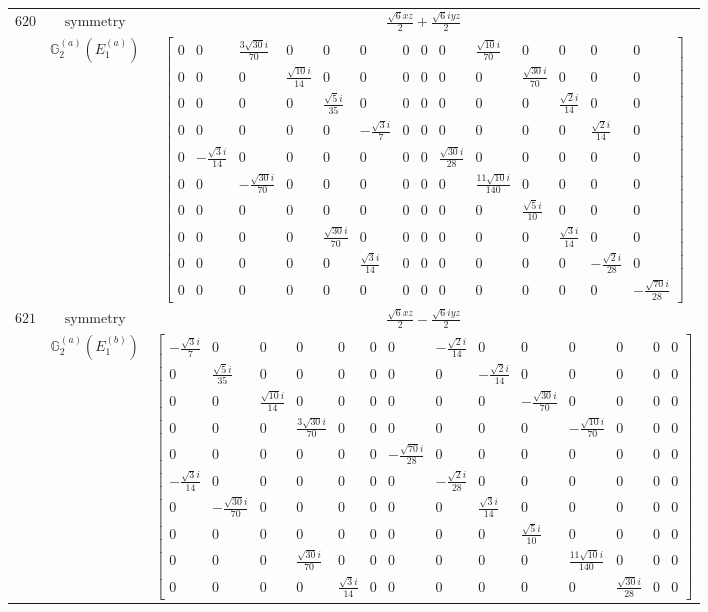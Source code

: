 \documentclass[fleqn,8pt,landscape]{jsarticle}
\begin{document}
\begin{longtable}{ccc}
$ 620 $ & $ \text{symmetry} $ & $ \frac{\sqrt{6} x z}{2} + \frac{\sqrt{6} i y z}{2} $ \\
$  $ & $ \mathbb{G}_{2}^{(a)}(E_{1}^{(a)}) $ & $ \begin{bmatrix} 0 & 0 & \frac{3 \sqrt{30} i}{70} & 0 & 0 & 0 & 0 & 0 & 0 & \frac{\sqrt{10} i}{70} & 0 & 0 & 0 & 0 \\ 0 & 0 & 0 & \frac{\sqrt{10} i}{14} & 0 & 0 & 0 & 0 & 0 & 0 & \frac{\sqrt{30} i}{70} & 0 & 0 & 0 \\ 0 & 0 & 0 & 0 & \frac{\sqrt{5} i}{35} & 0 & 0 & 0 & 0 & 0 & 0 & \frac{\sqrt{2} i}{14} & 0 & 0 \\ 0 & 0 & 0 & 0 & 0 & - \frac{\sqrt{3} i}{7} & 0 & 0 & 0 & 0 & 0 & 0 & \frac{\sqrt{2} i}{14} & 0 \\ 0 & - \frac{\sqrt{3} i}{14} & 0 & 0 & 0 & 0 & 0 & 0 & \frac{\sqrt{30} i}{28} & 0 & 0 & 0 & 0 & 0 \\ 0 & 0 & - \frac{\sqrt{30} i}{70} & 0 & 0 & 0 & 0 & 0 & 0 & \frac{11 \sqrt{10} i}{140} & 0 & 0 & 0 & 0 \\ 0 & 0 & 0 & 0 & 0 & 0 & 0 & 0 & 0 & 0 & \frac{\sqrt{5} i}{10} & 0 & 0 & 0 \\ 0 & 0 & 0 & 0 & \frac{\sqrt{30} i}{70} & 0 & 0 & 0 & 0 & 0 & 0 & \frac{\sqrt{3} i}{14} & 0 & 0 \\ 0 & 0 & 0 & 0 & 0 & \frac{\sqrt{3} i}{14} & 0 & 0 & 0 & 0 & 0 & 0 & - \frac{\sqrt{2} i}{28} & 0 \\ 0 & 0 & 0 & 0 & 0 & 0 & 0 & 0 & 0 & 0 & 0 & 0 & 0 & - \frac{\sqrt{70} i}{28} \end{bmatrix} $ \\ \hline
$ 621 $ & $ \text{symmetry} $ & $ \frac{\sqrt{6} x z}{2} - \frac{\sqrt{6} i y z}{2} $ \\
$  $ & $ \mathbb{G}_{2}^{(a)}(E_{1}^{(b)}) $ & $ \begin{bmatrix} - \frac{\sqrt{3} i}{7} & 0 & 0 & 0 & 0 & 0 & 0 & - \frac{\sqrt{2} i}{14} & 0 & 0 & 0 & 0 & 0 & 0 \\ 0 & \frac{\sqrt{5} i}{35} & 0 & 0 & 0 & 0 & 0 & 0 & - \frac{\sqrt{2} i}{14} & 0 & 0 & 0 & 0 & 0 \\ 0 & 0 & \frac{\sqrt{10} i}{14} & 0 & 0 & 0 & 0 & 0 & 0 & - \frac{\sqrt{30} i}{70} & 0 & 0 & 0 & 0 \\ 0 & 0 & 0 & \frac{3 \sqrt{30} i}{70} & 0 & 0 & 0 & 0 & 0 & 0 & - \frac{\sqrt{10} i}{70} & 0 & 0 & 0 \\ 0 & 0 & 0 & 0 & 0 & 0 & - \frac{\sqrt{70} i}{28} & 0 & 0 & 0 & 0 & 0 & 0 & 0 \\ - \frac{\sqrt{3} i}{14} & 0 & 0 & 0 & 0 & 0 & 0 & - \frac{\sqrt{2} i}{28} & 0 & 0 & 0 & 0 & 0 & 0 \\ 0 & - \frac{\sqrt{30} i}{70} & 0 & 0 & 0 & 0 & 0 & 0 & \frac{\sqrt{3} i}{14} & 0 & 0 & 0 & 0 & 0 \\ 0 & 0 & 0 & 0 & 0 & 0 & 0 & 0 & 0 & \frac{\sqrt{5} i}{10} & 0 & 0 & 0 & 0 \\ 0 & 0 & 0 & \frac{\sqrt{30} i}{70} & 0 & 0 & 0 & 0 & 0 & 0 & \frac{11 \sqrt{10} i}{140} & 0 & 0 & 0 \\ 0 & 0 & 0 & 0 & \frac{\sqrt{3} i}{14} & 0 & 0 & 0 & 0 & 0 & 0 & \frac{\sqrt{30} i}{28} & 0 & 0 \end{bmatrix} $ \\ \hline

\end{longtable}
\end{document}
